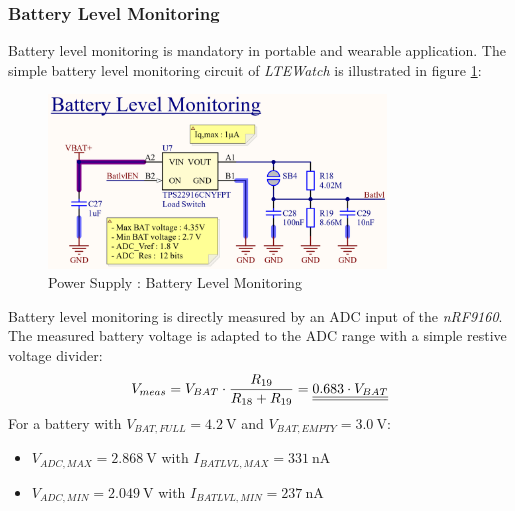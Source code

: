 \documentclass[report.tex]{subfiles}
\begin{document}
\subsubsection{Battery Level Monitoring}

Battery level monitoring is mandatory in portable and wearable application. The simple battery level monitoring circuit of \textit{LTEWatch} is illustrated in figure \ref{fig:LTEWatch_Power_Supply_Batt_LVL_Monitoring}:

\begin{figure}[H]
	\centering
	\includegraphics[width=0.8\textwidth]{Include/Figure/Hardware/LTEWatch_Power_Supply_Batt_LVL_Monitoring}
	\caption{Power Supply : Battery Level Monitoring}
	\label{fig:LTEWatch_Power_Supply_Batt_LVL_Monitoring}
\end{figure}

Battery level monitoring is directly measured by an ADC input of the \textit{nRF9160}. The measured battery voltage is adapted to the ADC range with a simple restive voltage divider:
$$
V_{meas} = V_{BAT} \cdot \dfrac{R_{19}}{R_{18} + R_{19}} = \underline{\underline{0.683\cdot V_{BAT}}}
$$
For a battery with $V_{BAT,FULL} = \SI{4.2}{\volt}$ and $V_{BAT,EMPTY} = \SI{3.0}{\volt}$:
\begin{itemize}
\item $V_{ADC,MAX} = \SI{2.868}{\volt}$ with $I_{BATLVL,MAX} = \SI{331}{\nano\ampere}$
\item $V_{ADC,MIN} = \SI{2.049}{\volt}$ with $I_{BATLVL,MIN} = \SI{237}{\nano\ampere}$
\end{itemize}
\end{document}
